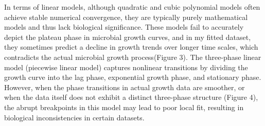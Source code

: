 \documentclass[12pt]{article}
\begin{document}
In terms of linear models, although quadratic and cubic polynomial models often achieve stable numerical convergence, they are typically purely mathematical models and thus lack biological significance. These models fail to accurately depict the plateau phase in microbial growth curves, and in my fitted dataset, they sometimes predict a decline in growth trends over longer time scales, which contradicts the actual microbial growth process(Figure 3). The three-phase linear model (piecewise linear model) captures nonlinear transitions by dividing the growth curve into the lag phase, exponential growth phase, and stationary phase. However, when the phase transitions in actual growth data are smoother, or when the data itself does not exhibit a distinct three-phase structure (Figure 4), the abrupt breakpoints in this model may lead to poor local fit, resulting in biological inconsistencies in certain datasets.
\end{document}
